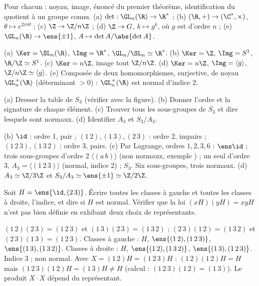 \begin{exo}
Pour chacun : noyau, image, énoncé du premier théorème, identification du quotient à un groupe connu. (a) $\det:\GL_n(\R)\to\R^*$ ; (b) $(\R,+)\to(\C^*,\times)$, $\theta\mapsto e^{2i\pi\theta}$ ; (c) $\Z\to\Z/n\Z$ ; (d) $\Z\to G$, $k\mapsto g^k$, où $g$ est d'ordre $n$ ; (e) $\GL_n(\R)\to\ens{\pm1}$, $A\mapsto\det A/\abs{\det A}$.
\begin{corrige}
(a) $\Ker=\SL_n(\R)$, $\Img=\R^*$, $\GL_n/\SL_n\simeq\R^*$. (b) $\Ker=\Z$, $\Img=S^1$, $\R/\Z\simeq S^1$. (c) $\Ker=n\Z$, image tout $\Z/n\Z$. (d) $\Ker=n\Z$, $\Img=\langle g\rangle$, $\Z/n\Z\simeq\langle g\rangle$. (e) Composée de deux homomorphismes, surjective, de noyau $\GL_n^+(\R)$ (déterminant $>0$) : $\GL_n^+(\R)$ est normal d'indice 2.
\end{corrige}
\end{exo}
\begin{exo}[S][Étudier $S_3$]
(a) Dresser la table de $S_3$ (vérifier avec la figure). (b) Donner l'ordre et la signature de chaque élément. (c) Trouver tous les sous-groupes de $S_3$ et dire lesquels sont normaux. (d) Identifier $A_3$ et $S_3/A_3$.
\begin{corrige}
(b) $\id$ : ordre 1, pair ; $(1\,2),(1\,3),(2\,3)$ : ordre 2, impairs ; $(1\,2\,3),(1\,3\,2)$ : ordre 3, pairs. (c) Par Lagrange, ordres $1,2,3,6$ : $\ens\id$ ; trois sous-groupes d'ordre 2 $\langle(a\,b)\rangle$ (non normaux, exemple ) ; un seul d'ordre 3, $A_3=\langle(1\,2\,3)\rangle$ (normal, indice 2) ; $S_3$. Six sous-groupes, trois normaux. (d) $A_3\simeq\Z/3\Z$ et $S_3/A_3\simeq\ens{\pm1}\simeq\Z/2\Z$.
\end{corrige}
\end{exo}
\begin{exo}
Soit $H=\ens{\id,(2\,3)}$. Écrire toutes les classes à gauche et toutes les classes à droite, l'indice, et dire si $H$ est normal. Vérifier que la \og loi \fg{} $(xH)(yH)=xyH$ n'est pas bien définie en exhibant deux choix de représentants.
\begin{corrige}
$(1\,2)(2\,3)=(1\,2\,3)$ et $(1\,3)(2\,3)=(1\,3\,2)$ ; $(2\,3)(1\,2)=(1\,3\,2)$ et $(2\,3)(1\,3)=(1\,2\,3)$. Classes à gauche : $H$, $\ens{(1\,2),(1\,2\,3)}$, $\ens{(1\,3),(1\,3\,2)}$. Classes à droite : $H$, $\ens{(1\,2),(1\,3\,2)}$, $\ens{(1\,3),(1\,2\,3)}$. Indice 3 ; non normal. Avec $X=(1\,2)H=(1\,2\,3)H$ : $(1\,2)(1\,2)H=H$ mais $(1\,2\,3)(1\,2)H=(1\,3)H\neq H$ (calcul : $(1\,2\,3)(1\,2)=(1\,3)$). Le produit $X\cdot X$ dépend du représentant.
\end{corrige}
\end{exo}
